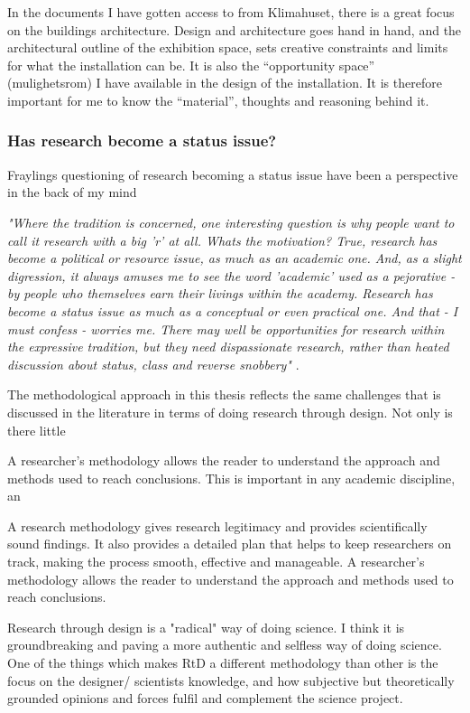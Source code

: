 In the documents I have gotten access to from Klimahuset, there is a great focus on the buildings architecture. Design and architecture goes hand in hand, and the architectural outline of the exhibition space, sets creative constraints and limits for what the installation can be. It is also the “opportunity space” (mulighetsrom) I have available in the design of the installation. It is therefore important for me to know the “material”, thoughts and reasoning behind it.


\subsubsection{Has research become a status issue?}
Fraylings questioning of research becoming a status issue have been a perspective in the back of my mind 

\emph{"Where the tradition is concerned, one interesting question is why people want to call it research with a big 'r' at all. Whats the motivation? True, research has become a political or resource issue, as much as an academic one. And, as a slight digression, it always amuses me to see the word 'academic' used as a pejorative - by people who themselves earn their livings within the academy. Research has become a status issue as much as a conceptual or even practical one. And that - I must confess - worries me. There may well be opportunities for research within the expressive tradition, but they need dispassionate research, rather than heated discussion about status, class and reverse snobbery"} \autocite[p. 5]{frayling_1994}.



The methodological approach in this thesis reflects the same challenges that is discussed in the literature in terms of doing research through design. Not only is there little 

A researcher's methodology allows the reader to understand the approach and methods used to reach conclusions. This is important in any academic discipline, an

A research methodology gives research legitimacy and provides scientifically sound findings. It also provides a detailed plan that helps to keep researchers on track, making the process smooth, effective and manageable. A researcher's methodology allows the reader to understand the approach and methods used to reach conclusions.



Research through design is a "radical" way of doing science. I think it is groundbreaking and paving a more authentic and selfless way of doing science. One of the things which makes RtD a different methodology than other is the focus on the designer/ scientists knowledge, and how subjective but theoretically grounded opinions and forces fulfil and complement the science project. 

